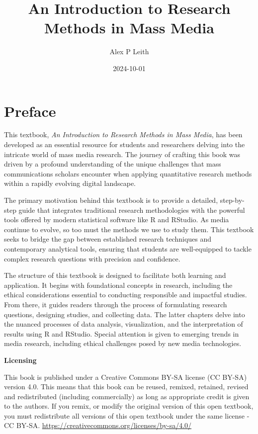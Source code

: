 \documentclass[
]{book}
\title{An Introduction to Research Methods in Mass Media}
\author{Alex P Leith}
\date{2024-10-01}
\begin{document}
\maketitle

{
\setcounter{tocdepth}{1}
\tableofcontents
}
\chapter*{Preface}\label{preface}

This textbook, \emph{An Introduction to Research Methods in Mass Media}, has been developed as an essential resource for students and researchers delving into the intricate world of mass media research. The journey of crafting this book was driven by a profound understanding of the unique challenges that mass communications scholars encounter when applying quantitative research methods within a rapidly evolving digital landscape.

The primary motivation behind this textbook is to provide a detailed, step-by-step guide that integrates traditional research methodologies with the powerful tools offered by modern statistical software like R and RStudio. As media continue to evolve, so too must the methods we use to study them. This textbook seeks to bridge the gap between established research techniques and contemporary analytical tools, ensuring that students are well-equipped to tackle complex research questions with precision and confidence.

The structure of this textbook is designed to facilitate both learning and application. It begins with foundational concepts in research, including the ethical considerations essential to conducting responsible and impactful studies. From there, it guides readers through the process of formulating research questions, designing studies, and collecting data. The latter chapters delve into the nuanced processes of data analysis, visualization, and the interpretation of results using R and RStudio. Special attention is given to emerging trends in media research, including ethical challenges posed by new media technologies.

\textbf{Licensing}

This book is published under a Creative Commons BY-SA license (CC BY-SA) version 4.0. This means that this book can be reused, remixed, retained, revised and redistributed (including commercially) as long as appropriate credit is given to the authors. If you remix, or modify the original version of this open textbook, you must redistribute all versions of this open textbook under the same license - CC BY-SA. \url{https://creativecommons.org/licenses/by-sa/4.0/}
\end{document}
